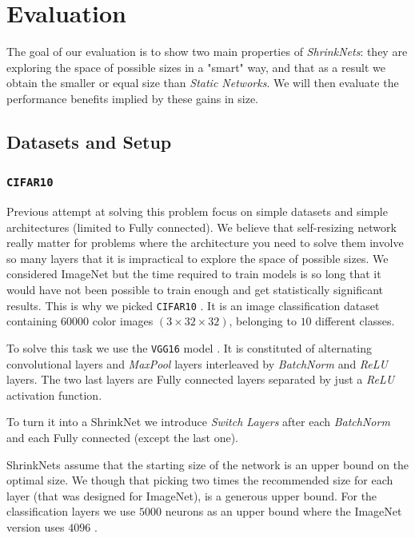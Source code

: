 \section{Evaluation}

The goal of our evaluation is to show two main properties of
\textit{ShrinkNets}: they are exploring the space of possible sizes in a "smart"
way, and that as a result we obtain the smaller or equal size than
\textit{Static Networks}. We will then evaluate the performance benefits implied
by these gains in size.

\subsection{Datasets and Setup}

\subsubsection{\texttt{CIFAR10}}

Previous attempt at solving this problem focus on simple datasets and simple
architectures (limited to Fully connected). We believe that self-resizing
network really matter for problems where the architecture you need to solve them
involve so many layers that it is impractical to explore the space of possible
sizes. We considered ImageNet \cite{ILSVRC15} but the time required to train models is so long
that it would have not been possible to train enough and get statistically
significant results. This is why we picked \texttt{CIFAR10} \cite{Krizhevsky2009}. It is an
image classification dataset containing $60000$ color images $(3 \times 32
\times 32)$, belonging to $10$ different classes.

To solve this task we use the \texttt{VGG16} model \cite{Srivastava2014}. It is
constituted of alternating convolutional layers and \textit{MaxPool} layers
interleaved by \textit{BatchNorm} \cite{DBLP:journals/corr/IoffeS15} and
\textit{ReLU} \cite{Nair2010}  layers. The two last layers are Fully connected
layers separated by just a \textit{ReLU} activation function.

To turn it into a ShrinkNet we introduce \textit{Switch Layers} after each
\textit{BatchNorm} and each Fully connected (except the last one).

ShrinkNets assume that the starting size of the network is an upper bound on the
optimal size. We though that picking two times the recommended size for each
layer (that was designed for ImageNet), is a generous upper bound. For the
classification layers we use $5000$ neurons as an upper bound where the ImageNet
version uses $4096$ .

